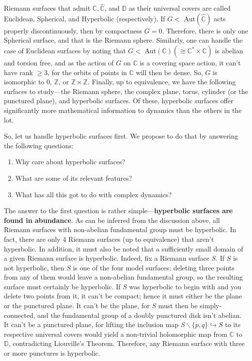 \documentclass[11pt,a4paper]{article}
\begin{document}


        Riemann surfaces that admit $\mathbb{C},\hat{\mathbb{C}}$, and $\mathbb{D}$ as their universal covers are called Euclidean, Spherical, and Hyperbolic (respectively). If $G < $ Aut$(\hat{\mathbb{C}})$ acts properly discontinuously, then by compactness $G = {0}$. Therefore, there is only one Spherical surface, and that is the Riemann sphere. Similarly, one can handle the case of Euclidean surfaces by noting that $G < $ Aut$(\mathbb{C}) (\cong \mathbb{C}^*\times\mathbb{C})$ is abelian and torsion free, and as the action of $G$ on $\mathbb{C}$ is a covering space action, it can't have rank $\geq 3$, for the orbits of points in $\mathbb{C}$ will then be dense. So, $G$ is isomorphic to ${0}$, $\mathbb{Z}$, or $\mathbb{Z}\times\mathbb{Z}$. Finally, up to equivalence, we have the following surfaces to study---the Riemann sphere, the complex plane, torus, cylinder (or the punctured plane), and hyperbolic surfaces. Of these, hyperbolic surfaces offer significantly more mathematical information to dynamics than the others in the lot.

        So, let us handle hyperbolic surfaces first. We propose to do that by answering the following questions:
        \begin{enumerate}
            \item Why care about hyperbolic surfaces?
            \item What are some of its relevant features?
            \item What has all this got to do with complex dynamics?
        \end{enumerate}


        The answer to the first question is rather simple---\textbf{hyperbolic surfaces are found in abundance}. As can be inferred from the discussion above, all Riemann surfaces with non-abelian fundamental group must be hyperbolic. In fact, there are only 4 Riemann surfaces (up to equivalence) that aren't hyperbolic. In addition, it must also be noted that a sufficiently small domain of a given Riemann surface is hyperbolic. Indeed, fix a Riemann surface $S$. If $S$ is not hyperbolic, then $S$ is one of the four model surfaces; deleting three points from any of them would leave a non-abelian fundamental group, so the resulting surface must certainly be hyperbolic. If $S$ was hyperbolic to begin with and you delete two points from it, it can't be compact; hence it must either be the plane or the punctured plane. It can't be the plane, for $S$ must then be simply-connected, and the fundamental group of a doubly punctured disk isn't abelian. It can't be a punctured plane, for lifting the inclusion map $S\backslash\{p, q\} \hookrightarrow S$ to its respective universal covers would yield a non-trivial holomorphic map from $\mathbb{C}$ to $\mathbb{D}$, contradicting Liouville's Theorem. Therefore, any Riemann surface with three or more punctures is hyperbolic.
\end{document}
